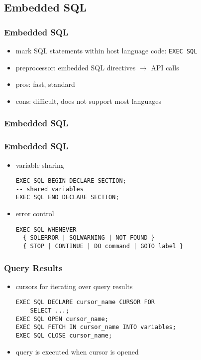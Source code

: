 \documentclass[dvipsnames]{beamer}
\theoremstyle{plain}
\begin{document}
\subsection{Embedded SQL}

\lstset{language=EmbeddedSQL}

\begin{frame}
  \frametitle{Embedded SQL}

  \begin{itemize}
    \item mark SQL statements within host language code: \lstinline!EXEC SQL!
    \item preprocessor: embedded SQL directives $\rightarrow$ API calls

    \pause
    \bigskip
    \item pros: fast, standard
    \item cons: difficult, does not support most languages
  \end{itemize}
\end{frame}

\begin{frame}
  \frametitle{Embedded SQL}

  \begin{center}
  \end{center}

  \hyperlink{odbc}{}
\end{frame}

\begin{frame}[fragile]
  \frametitle{Embedded SQL}

  \begin{itemize}
    \item variable sharing
    \begin{lstlisting}
EXEC SQL BEGIN DECLARE SECTION;
-- shared variables
EXEC SQL END DECLARE SECTION;
    \end{lstlisting}

    \pause
    \medskip
    \item error control
    \begin{lstlisting}
EXEC SQL WHENEVER
  { SQLERROR | SQLWARNING | NOT FOUND }
  { STOP | CONTINUE | DO command | GOTO label }
    \end{lstlisting}
  \end{itemize}
\end{frame}

\begin{frame}[fragile]
  \frametitle{Query Results}

  \begin{itemize}
    \item cursors for iterating over query results
    \begin{lstlisting}
EXEC SQL DECLARE cursor_name CURSOR FOR
    SELECT ...;
EXEC SQL OPEN cursor_name;
EXEC SQL FETCH IN cursor_name INTO variables;
EXEC SQL CLOSE cursor_name;
    \end{lstlisting}

    \medskip
    \item query is executed when cursor is opened
  \end{itemize}
\end{frame}
\end{document}
